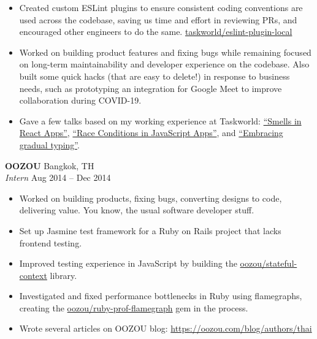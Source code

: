 \documentclass[a4paper]{article}
\newcommand{\github} [1] {\href{https://github.com/#1}{#1}}
\begin{document}
\begin{itemize}
	\item Created custom ESLint plugins to ensure consistent coding conventions are used across the codebase, saving us time and effort in reviewing PRs, and encouraged other engineers to do the same. \github{taskworld/eslint-plugin-local}
    
	\item Worked on building product features and fixing bugs while remaining focused on long-term maintainability and developer experience on the codebase. Also built some quick hacks (that are easy to delete!) in response to business needs, such as prototyping an integration for Google Meet to improve collaboration during COVID-19.
    
	\item Gave a few talks based on my working experience at Taskworld: \href{https://dt.in.th/smells-in-react-apps.html}{“Smells in React Apps”}, \href{https://dt.in.th/race-conditions-in-js-apps.html}{“Race Conditions in JavaScript Apps”}, and \href{https://dt.in.th/embracing-gradual-typing.html}{“Embracing gradual typing”}.
    
\end{itemize}

\textbf{OOZOU} \hfill Bangkok, TH\\
\textit{Intern} \hfill Aug 2014 – Dec 2014\\
\vspace{-1mm}
\begin{itemize} \itemsep 1pt
    
	\item Worked on building products, fixing bugs, converting designs to code, delivering value. You know, the usual software developer stuff.
    
	\item Set up Jasmine test framework for a Ruby on Rails project that lacks frontend testing.
    
	\item Improved testing experience in JavaScript by building the \github{oozou/stateful-context} library.
    
	\item Investigated and fixed performance bottlenecks in Ruby using flamegraphs, creating the \github{oozou/ruby-prof-flamegraph} gem in the process.
    
	\item Wrote several articles on OOZOU blog: \url{https://oozou.com/blog/authors/thai}
    
\end{itemize}
\end{document}
